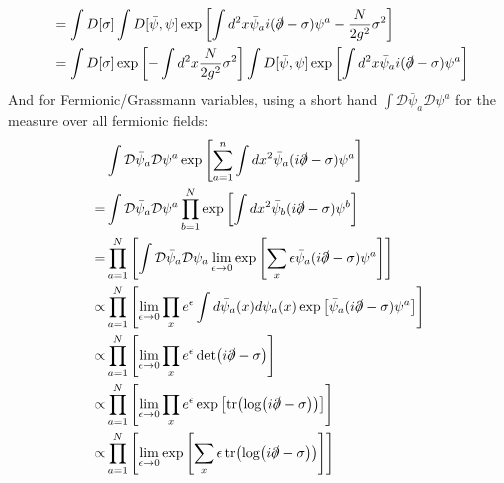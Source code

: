 \documentclass[12pt,a4]{article}
\begin{document}
\begin{enumerate}
\begin{enumerate}
\begin{align*}
            &= \int D[\sigma] \int D[\bar{\psi}, \psi] \exp\left[\int d^2x \bar{\psi}_a i (\slashed{\partial} - \sigma ) \psi^a - \frac{N}{2g^2} \sigma^2\right]\\
            &= \int D[\sigma] \exp\left[- \int d^2x \frac{N}{2g^2} \sigma^2\right]\int D[\bar{\psi}, \psi] \exp\left[\int d^2x \bar{\psi}_a i (\slashed{\partial} - \sigma ) \psi^a \right]\\
        \end{align*}
        And for Fermionic/Grassmann variables, using a short hand $\int \mathcal{D} \bar{\psi}_a \mathcal{D} \psi^a$ for the measure over all fermionic fields:
        \begin{align*}
          &\int \mathcal{D} \bar{\psi}_a \mathcal{D} \psi^a \exp\left[\sum_{a = 1}^n\int dx^2 \bar{\psi}_a (i \slashed{\partial} - \sigma) \psi^a \right] \\
          =& \int \mathcal{D} \bar{\psi}_a \mathcal{D} \psi^a \prod_{b = 1}^N \exp\left[\int dx^2 \bar{\psi}_b (i \slashed{\partial} - \sigma) \psi^b \right]\\
                                                                                                                                             =& \prod_{a = 1}^N \left[\int \mathcal{D} \bar{\psi}_a \mathcal{D} \psi_a  \lim_{\epsilon \to 0}\exp\left[\sum_x \epsilon \bar{\psi}_a (i \slashed{\partial} - \sigma) \psi^a \right]\right]\\
                                                                                                                                       \propto      &  \prod_{a = 1}^N \left[\lim_{\epsilon \to 0}  \prod_x e^\epsilon \int d \bar{\psi}_a(x) d \psi_a(x)  \exp\left[\bar{\psi}_a (i \slashed{\partial} - \sigma) \psi^a \right]\right]\\
                                                                                                                                       \propto      & \prod_{a = 1}^N \left[\lim_{\epsilon \to 0} \prod_xe^\epsilon \det(i \slashed{\partial} - \sigma)\right]\\
                                                                                                                                       \propto      & \prod_{a = 1}^N \left[\lim_{\epsilon \to 0} \prod_x e^\epsilon \exp\left[\tr(\log(i \slashed{\partial} - \sigma))\right]\right]\\
                                                                                                                                       \propto      & \prod_{a = 1}^N \left[\lim_{\epsilon \to 0} \exp\left[\sum_x \epsilon\tr(\log(i \slashed{\partial} - \sigma))\right]\right]\\

\end{align*}
\end{enumerate}
\end{enumerate}
\end{document}
